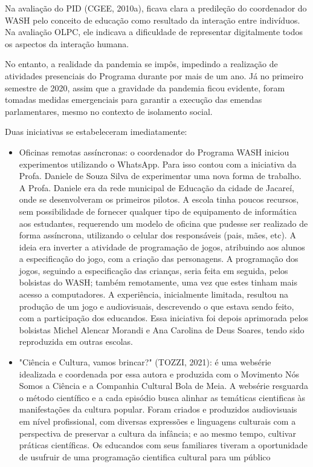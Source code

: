 Na avaliação do PID (CGEE, 2010a), ficava clara a predileção do coordenador do WASH pelo conceito de educação como resultado da interação entre indivíduos. Na avaliação OLPC, ele indicava a dificuldade de representar digitalmente todos os aspectos da interação humana.

No entanto, a realidade da pandemia se impôs, impedindo a realização de atividades presenciais do Programa durante por mais de um ano. Já no primeiro semestre de 2020, assim que a gravidade da pandemia ficou evidente, foram tomadas medidas emergenciais para garantir a execução das emendas parlamentares, mesmo no contexto de isolamento social.

Duas iniciativas se estabeleceram imediatamente:


\begin{itemize}
\item Oficinas remotas assíncronas: o coordenador do Programa WASH iniciou experimentos utilizando o WhatsApp. Para isso contou com a iniciativa da Profa. Daniele de Souza Silva de experimentar uma nova forma de trabalho. A Profa. Daniele era da rede municipal de Educação da cidade de Jacareí, onde se desenvolveram os primeiros pilotos. A escola tinha poucos recursos, sem possibilidade de fornecer qualquer tipo de equipamento de informática aos estudantes, requerendo um modelo de oficina que pudesse ser realizado de forma assíncrona, utilizando o celular dos responsáveis (pais, mães, etc). A ideia era inverter a atividade de programação de jogos, atribuindo aos alunos a especificação do jogo, com a criação das personagens. A programação dos jogos, seguindo a especificação das crianças, seria feita em seguida, pelos bolsistas do WASH; também remotamente, uma vez que estes tinham mais acesso a computadores. A experiência, inicialmente limitada, resultou na produção de um jogo e audiovisuais, descrevendo o que estava sendo feito, com a participação dos educandos. Essa iniciativa foi depois aprimorada pelos bolsistas Michel Alencar Morandi e Ana Carolina de Deus Soares, tendo sido reproduzida em outras escolas.
\item "Ciência e Cultura, vamos brincar?"  (TOZZI, 2021): é uma websérie idealizada  e coordenada por essa  autora e produzida com o Movimento Nós Somos a Ciência e a Companhia Cultural Bola de Meia. A websérie resguarda o método científico e a cada episódio  busca  alinhar as temáticas cientificas às manifestações  da cultura popular.  Foram criados e produzidos audiovisuais em nível profissional, com diversas expressões e linguagens culturais  com a perspectiva de preservar a cultura da infância; e ao mesmo tempo,  cultivar práticas científicas.  Os educandos com seus familiares tiveram a oportunidade de usufruir de uma programação cientifica cultural para um público 

\end{itemize}
